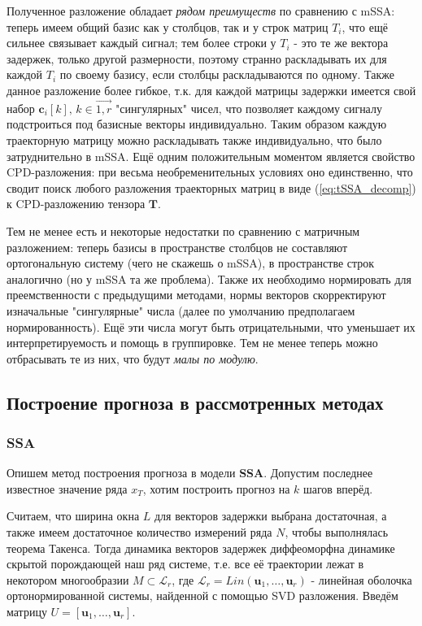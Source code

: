 			 Полученное разложение обладает \textit{рядом преимуществ} по сравнению с mSSA: теперь имеем общий базис как у столбцов, так и у строк матриц $ T_i $, что ещё сильнее связывает каждый сигнал; тем более строки у $ T_i $ - это те же вектора задержек, только другой размерности, поэтому странно раскладывать их для каждой $ T_i $ по своему базису, если столбцы раскладываются по одному. Также данное разложение более гибкое, т.к. для каждой матрицы задержки имеется свой набор $ \mathbf{c}_i[k], \,  k \in \overrightarrow{1, r} $ "сингулярных" чисел, что позволяет каждому сигналу подстроиться под базисные векторы индивидуально. Таким образом каждую траекторную матрицу можно раскладывать также индивидуально, что было затруднительно в mSSA. Ещё одним положительным моментом является свойство CPD-разложения: при весьма необременительных условиях оно единственно, что сводит поиск любого разложения траекторных матриц в виде (\ref{eq:tSSA_decomp}) к CPD-разложению тензора $ \mathbf{T} $.
			 
			 
			 Тем не менее есть и некоторые недостатки по сравнению с матричным разложением: теперь базисы в пространстве столбцов не составляют ортогональную систему (чего не скажешь о mSSA), в пространстве строк аналогично (но у mSSA та же проблема). Также их необходимо нормировать для преемственности с предыдущими методами, нормы векторов скорректируют изначальные "сингулярные" числа (далее по умолчанию предполагаем нормированность). Ещё эти числа могут быть отрицательными, что уменьшает их интерпретируемость и помощь в группировке. Тем не менее теперь можно отбрасывать те из них, что будут \textit{малы по модулю}.
			 
			 
			 \subsection*{Построение прогноза в рассмотренных методах}
			 
			 \subsubsection*{SSA}
			 
			 Опишем метод построения прогноза в модели \textbf{SSA}. Допустим последнее известное значение ряда $ x_T $, хотим построить прогноз на $ k $ шагов вперёд.
			 
			 Считаем, что ширина окна $ L $ для векторов задержки выбрана достаточная, а также имеем достаточное количество измерений ряда $ N $, чтобы выполнялась теорема Такенса. Тогда динамика векторов задержек диффеоморфна динамике скрытой порождающей наш ряд системе, т.е. все её траектории лежат в некотором многообразии $ M \subset \mathcal{L}_r $, где $ \mathcal{L}_r = Lin(\mathbf{u}_1, \ldots, \mathbf{u}_r) $ - линейная оболочка ортонормированной системы, найденной с помощью SVD разложения. Введём матрицу $ U = [\mathbf{u}_1, \ldots, \mathbf{u}_r] $.
			 
